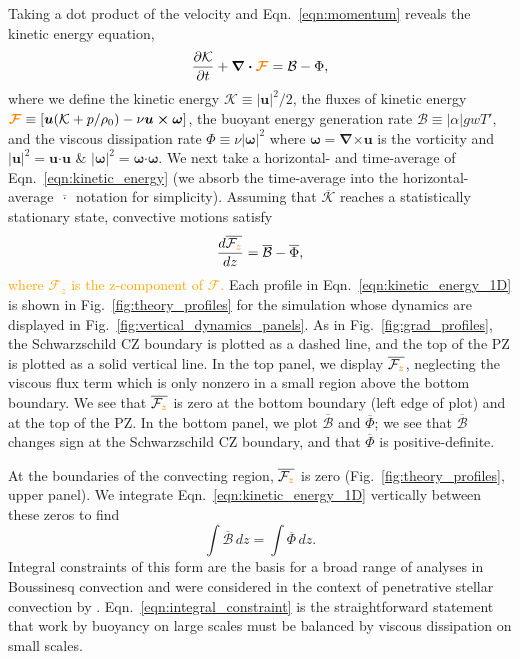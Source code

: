 \documentclass[twocolumn, linenumbers]{aastex631}
\renewcommand{\vec}[1]{\boldsymbol{#1}}
\renewcommand{\dot}{\vec{\cdot}}
\renewcommand{\bar}[1]{\overline{#1}}
\newcommand{\grad}{\vec{\nabla}}
\newcommand{\cross}{\vec{\times}}
\newcommand{\editone}[1]{\textcolor{orange}{#1}}
\begin{document}
Taking a dot product of the velocity and Eqn.~\ref{eqn:momentum} reveals the kinetic energy equation,
\begin{equation}
\frac{\partial \mathcal{K}}{\partial t}
    + \grad\dot\editone{\vec{\mathcal{F}}}
= \mathcal{B} - \Phi,
\label{eqn:kinetic_energy}
\end{equation}
where we define the kinetic energy $\mathcal{K} \equiv |\vec{u}|^2/2$, the fluxes of kinetic energy $\editone{\vec{\mathcal{F}}} \equiv \left[\vec{u}(\mathcal{K} + p/\rho_0) - \nu\vec{u}\cross\vec{\omega} \right]$, the buoyant energy generation rate $\mathcal{B} \equiv |\alpha| g w T'$, and the viscous dissipation rate $\Phi \equiv \nu |\vec{\omega}|^2$ where $\vec{\omega} = \grad\cross\vec{u}$ is the vorticity and $|\vec{u}|^2 = \vec{u}\dot\vec{u}$ \& $|\vec{\omega}|^2 = \vec{\omega}\dot\vec{\omega}$.
We next take a horizontal- and time-average of Eqn.~\ref{eqn:kinetic_energy} (we absorb the time-average into the horizontal-average $\bar{\,\cdot\,}$ notation for simplicity).
Assuming that $\bar{\mathcal{K}}$ reaches a statistically stationary state, convective motions satisfy
\begin{equation}
    \frac{d\bar{\mathcal{F}_{\editone{z}}}}{dz} = \bar{\mathcal{B}} - \bar{\Phi},
\label{eqn:kinetic_energy_1D}
\end{equation}
\editone{where $\mathcal{F}_z$ is the z-component of $\vec{\mathcal{F}}$.}
Each profile in Eqn.~\ref{eqn:kinetic_energy_1D} is shown in Fig.~\ref{fig:theory_profiles} for the simulation whose dynamics are displayed in Fig.~\ref{fig:vertical_dynamics_panels}.
As in Fig.~\ref{fig:grad_profiles}, the Schwarzschild CZ boundary is plotted as a dashed line, and the top of the PZ is plotted as a solid vertical line.
In the top panel, we display $\bar{\mathcal{F}_{\editone{z}}}$, neglecting the viscous flux term which is only nonzero in a small region above the bottom boundary.
We see that $\bar{\mathcal{F}_{\editone{z}}}$ is zero at the bottom boundary (left edge of plot) and at the top of the PZ.
In the bottom panel, we plot $\bar{\mathcal{B}}$ and $\bar{\Phi}$; we see that $\bar{\mathcal{B}}$ changes sign at the Schwarzschild CZ boundary, and that $\bar{\Phi}$ is positive-definite.

At the boundaries of the convecting region, $\bar{\mathcal{F}_{\editone{z}}}$ is zero (Fig.~\ref{fig:theory_profiles}, upper panel).
We integrate Eqn.~\ref{eqn:kinetic_energy_1D} vertically between these zeros to find
\begin{equation}
\int \bar{\mathcal{B}}\,dz = \int \bar{\Phi}\,dz.
\label{eqn:integral_constraint}
\end{equation}
Integral constraints of this form are the basis for a broad range of analyses in Boussinesq convection \citep[see e.g.,][]{ahlers_etal_2009, goluskin2016} and were considered in the context of penetrative stellar convection by \citet{roxburgh1989}.
Eqn.~\ref{eqn:integral_constraint} is the straightforward statement that work by buoyancy on large scales must be balanced by viscous dissipation on small scales.
\end{document}
